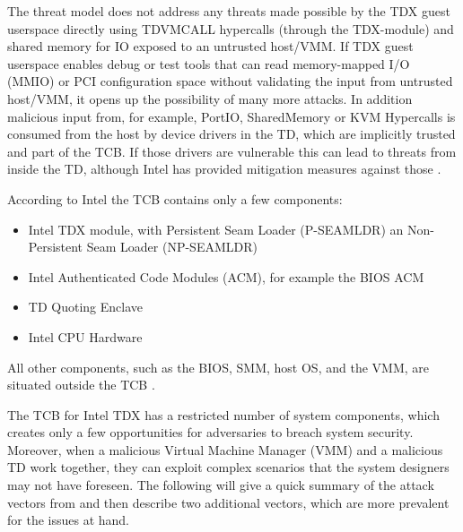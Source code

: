 The threat model does not address any threats made possible by the TDX guest userspace directly using TDVMCALL hypercalls (through the TDX-module) and shared memory for IO exposed to an untrusted host/VMM. If TDX guest userspace enables debug or test tools that can read memory-mapped I/O (MMIO) or PCI configuration space without validating the input from untrusted host/VMM, it opens up the possibility of many more attacks. In addition malicious input from, for example,  PortIO, SharedMemory or KVM Hypercalls is consumed from the host by device drivers in the TD, which are implicitly trusted and part of the TCB. If those drivers are vulnerable this can lead to threats from inside the TD, although Intel has provided mitigation measures against those \cite{elena_reshetova_intel_2023}.

According to Intel the TCB contains only a few components:

\begin{itemize}
    \item Intel TDX module, with Persistent Seam Loader (P-SEAMLDR) an Non-Persistent Seam Loader (NP-SEAMLDR)
    \item Intel Authenticated Code Modules (ACM), for example the BIOS ACM
    \item TD Quoting Enclave
    \item Intel CPU Hardware
\end{itemize}

All other components, such as the BIOS, SMM, host OS, and the VMM, are situated outside the TCB \cite{noauthor_tdx-whitepaper-february2022pdf_nodate}.


The TCB for Intel TDX has a restricted number of system components, which creates only a few opportunities for adversaries to breach system security. Moreover, when a malicious Virtual Machine Manager (VMM) and a malicious TD work together, they can exploit complex scenarios that the system designers may not have foreseen. The following will give a quick summary of the attack vectors from \cite{aktas_intel_nodate} and then describe two additional vectors, which are more prevalent for the issues at hand.



